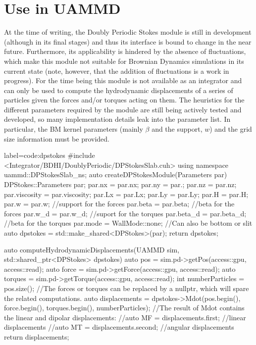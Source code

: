 \documentclass[twoside,openright,titlepage,numbers=noenddot,%
headinclude,footinclude,cleardoublepage=empty,abstract=on,
BCOR=5mm,fontsize=11pt, dvipsnames, paper=b5
]{scrreprt}
\begin{document}
\section*{Use in UAMMD}
At the time of writing, the Doubly Periodic Stokes module is still in development (although in its final stages) and thus its interface is bound to change in the near future. Furthermore, its applicability is hindered by the absence of fluctuations, which make this module not suitable for Brownian Dynamics simulations in its current state (note, however, that the addition of fluctuations is a work in progress). For the time being this module is not available as an integrator and can only be used to compute the hydrodynamic displacements of a series of particles given the forces and/or torques acting on them. The heuristics for the different parameters required by the module are still being actively tested and developed, so many implementation details leak into the parameter list. In particular, the BM kernel parameters (mainly $\beta$ and the support, $w$) and the grid size information must be provided.

\begin{code2}{label=code:dpstokes}
#include <Integrator/BDHI/DoublyPeriodic/DPStokesSlab.cuh>
using namespace uammd::DPStokesSlab_ns;  
auto createDPStokesModule(Parameters par){
  DPStokes::Parameters par;
  par.nx         = par.nx;
  par.ny         = par.;
  par.nz	 = par.nz;
  par.viscosity	 = par.viscosity;
  par.Lx	 = par.Lx;
  par.Ly	 = par.Ly;
  par.H		 = par.H;
  par.w = par.w; //support for the forces
  par.beta = par.beta; //beta for the forces
  par.w_d = par.w_d; //suport for the torques
  par.beta_d = par.beta_d; //beta for the torques
  par.mode = WallMode::none; //Can also be bottom or slit
  auto dpstokes = std::make_shared<DPStokes>(par);
  return dpstokes;
}

auto computeHydrodynamicDisplacements(UAMMD sim, std::shared_ptr<DPStokes> dpstokes){
  auto pos = sim.pd->getPos(access::gpu, access::read);
  auto force = sim.pd->getForce(access::gpu, access::read);
  auto torques = sim.pd->getTorque(access::gpu, access::read);
  int numberParticles = pos.size();
  //The forces or torques can be replaced by a nullptr, which will spare the related computations.
  auto displacements = dpstokes->Mdot(pos.begin(), force.begin(), torques.begin(), numberParticles);
  //The result of Mdot contains the linear and dipolar displacements:
  //auto MF = displacements.first; //linear displacements
  //auto MT = displacements.second; //angular displacements
  return displacements;
}

\end{code2}
\end{document}
